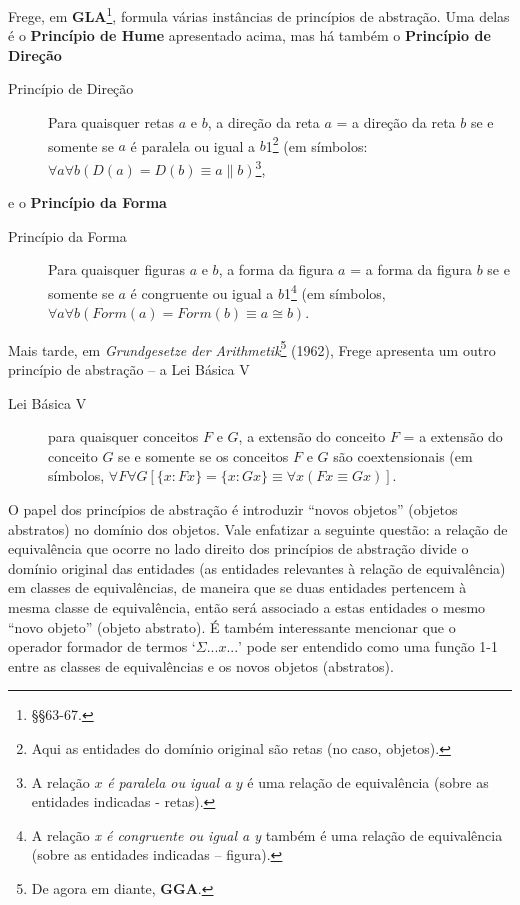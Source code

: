 Frege, em \textbf{GLA}\footnote{§§63-67.}, formula várias instâncias
de princípios de abstração. Uma delas é o \textbf{Princípio de Hume}
apresentado acima, mas há também o \textbf{Princípio de Direção}

\begin{description}

\item[Princípio de Direção]Para quaisquer retas $a$ e $b$, a
direção da reta $a$ = a direção da reta $b$ se e somente se $a$
é paralela ou igual a $b$1\footnote{Aqui as entidades do domínio original são 
retas (no caso, objetos). }
(em símbolos: $\forall a\forall b(D(a)=D(b)\equiv a\parallel b)$\footnote{A 
relação $x$ \textit{é paralela ou igual a} $y$ é uma relação de
equivalência (sobre as entidades indicadas - retas).},

\end{description}

\noindent e o \textbf{Princípio da Forma}

\begin{description}

\item[Princípio da Forma]Para quaisquer figuras $a$ e $b$, a forma
da figura $a$ = a forma da figura $b$ se e somente se $a$ é congruente
ou igual a $b$1\footnote{A relação \textit{x é congruente ou igual a y} também 
é uma relação
de equivalência (sobre as entidades indicadas – figura).} (em símbolos, 
$\forall a\forall b(Form(a)=Form(b)\equiv a\cong b)$.

\end{description}

Mais tarde, em \textit{Grundgesetze der Arithmetik}\footnote{De agora em diante,
\textbf{GGA}.}
(1962\nocite{Frege1962}), Frege apresenta um outro princípio de abstração
– a Lei Básica V

\begin{description}

\item[Lei Básica V]para quaisquer conceitos $F$ e $G$, a extensão
do conceito $F$ = a extensão do conceito $G$ se e somente se os
conceitos $F$ e $G$ são coextensionais (em símbolos, 
$\forall F\forall G[\{x:Fx\}=\{x:Gx\}\equiv\forall x(Fx\equiv Gx)]$.

\end{description}

O papel dos princípios de abstração é introduzir “novos objetos” (objetos
abstratos) no domínio dos objetos. Vale enfatizar a seguinte questão:
a relação de equivalência que ocorre no lado direito dos princípios
de abstração divide o domínio original das entidades (as entidades
relevantes à relação de equivalência) em classes de equivalências,
de maneira que se duas entidades pertencem à mesma classe de equivalência,
então será associado a estas entidades o mesmo “novo objeto” (objeto
abstrato). É também interessante mencionar que o operador formador
de termos `$\Sigma...x...$' pode ser entendido como uma função 1-1
entre as classes de equivalências e os novos objetos (abstratos).

